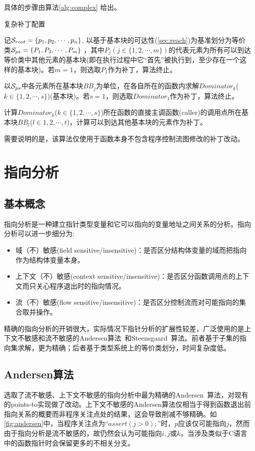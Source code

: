 具体的步骤由算法\autoref{alg:complex} 给出。
\begin{algorithm}\label{alg:complex}
  \caption{复杂补丁配置}
  \SetAlgoNoLine
  记$\mathcal{S}_{root} = \{p_1, p_2, \cdots , p_n\}$, 以基于基本块的可达性(\autoref{sec:reach})为基准划分为等价类$\mathcal{S} _{ps}=\{P_1, P_2, \cdots , P_m\}$ ，其中$P_j(j\in\{1, 2, \cdots , m\})$的代表元素为所有可以到达等价类中其他元素的基本块(即在执行过程中它“首先”被执行到，至少存在一个这样的基本块)。若$m=1$，则选取$P_1$作为补丁，算法终止。

以$\mathcal{S}_{ps}$中各元素所在基本块$BB_j$为单位，在各自所在的函数内求解$Dominator_k$($k\in\{1, 2, \cdots , s\}$)(基本块)。若$s=1$，则选取$Dominator_1$作为补丁，算法终止。

计算$Dominator_k$($k\in\{1, 2, \cdots , s\}$)所在函数的直接主调函数(caller)的调用点所在基本块$BB_l$($l\in{1, 2, \cdots , t}$)，计算可以到达其他基本块的元素作为补丁。
\end{algorithm}

需要说明的是，该算法仅使用于函数本身不包含程序控制流图修改的补丁改动。

\section{指向分析}
\label{sec:andersen}

\subsection{基本概念}
\label{subsec:pt_basic}

指向分析是一种建立指针类型变量和它可以指向的变量地址之间关系的分析。指向分析可以进一步细分为:
\begin{itemize}
\item 域（不）敏感(field sensitive/insensitive)：是否区分结构体变量的域而把指向作为结构体变量本身。
\item 上下文（不）敏感(context sensitive/insensitive)：是否区分函数调用点的上下文而只关心程序退出时的指向情况。
\item 流（不）敏感(flow sensitive/insensitive)：是否区分控制流而对可能指向的集合取并操作。
\end{itemize}

精确的指向分析的开销很大，实际情况下指针分析的扩展性较差，广泛使用的是上下文不敏感和流不敏感的Andersen算法~和Steensgaard~算法。前者基于子集的指向集求解，更为精确；后者基于类型系统上的等价类划分，时间复杂度低。

\subsection{Andersen算法}
\label{subsec:andersen}
选取了流不敏感、上下文不敏感的指向分析中最为精确的Andersen~算法，对现有的points-to实现做了改动。上下文不敏感的Andersen算法仅相当于得到函数退出前指向关系的概要而非程序关注点处的结果，这会导致削减不够精确。如\autoref{fig:andersen}中，当程序关注点为“$assert(j > 0);$”时，$p$应该仅可能指向$j$，然而由于指向分析是流不敏感的，故仍然会认为可能指向$i, j$或$k$。当涉及类似于C语言中的函数指针时会保留更多的不相关分支。

